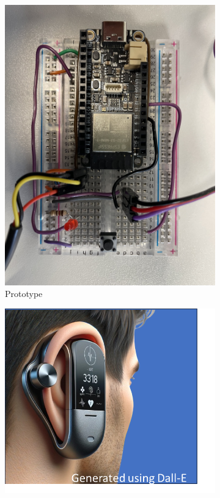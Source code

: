 \begin{figure}[h!]
    \centering
    \begin{subfigure}[b]{0.45\linewidth}
        \includegraphics[width=\linewidth]{images/v6-hardware.jpg}
        \caption{Prototype}
        \label{fig:fig-proto}
    \end{subfigure}
    \hfill
    \begin{subfigure}[b]{0.45\linewidth}
        \includegraphics[width=\linewidth]{images/dall-e.png}

\end{subfigure}
\end{figure}
